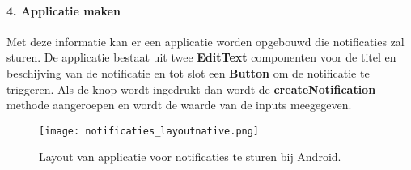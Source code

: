 \paragraph{4. Applicatie maken}
Met deze informatie kan er een applicatie worden opgebouwd die notificaties zal sturen. De applicatie bestaat 
uit twee \textbf{EditText} componenten voor de titel en beschijving van de notificatie en tot slot een 
\textbf{Button} om de notificatie te triggeren. Als de knop wordt ingedrukt dan wordt de 
\textbf{createNotification} methode aangeroepen en wordt de waarde van de inputs meegegeven.
\begin{figure}[H]
  \centering
  \texttt{[image: notificaties\_layoutnative.png]}
  \caption{Layout van applicatie voor notificaties te sturen bij Android.}
\end{figure}